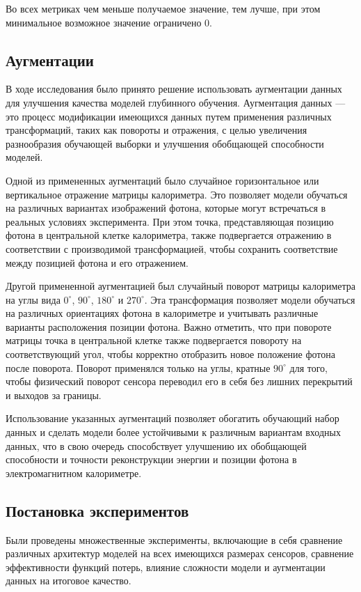 \documentclass[a4paper,12pt]{extarticle}
\begin{document}
Во всех метриках чем меньше получаемое значение, тем лучше, при этом минимальное возможное значение ограничено $0$.

\subsection{Аугментации}
\label{subsection:augmentations}

В ходе исследования было принято решение использовать аугментации данных для улучшения качества моделей глубинного обучения. Аугментация данных --- это процесс модификации имеющихся данных путем применения различных трансформаций, таких как повороты и отражения, с целью увеличения разнообразия обучающей выборки и улучшения обобщающей способности моделей.

Одной из примененных аугментаций было случайное горизонтальное или вертикальное отражение матрицы калориметра. Это позволяет модели обучаться на различных вариантах изображений фотона, которые могут встречаться в реальных условиях эксперимента. При этом точка, представляющая позицию фотона в центральной клетке калориметра, также подвергается отражению в соответствии с производимой трансформацией, чтобы сохранить соответствие между позицией фотона и его отражением.

Другой примененной аугментацией был случайный поворот матрицы калориметра на углы вида $0^{\circ}$, $90^{\circ}$, $180^{\circ}$ и $270^{\circ}$. Эта трансформация позволяет модели обучаться на различных ориентациях фотона в калориметре и учитывать различные варианты расположения позиции фотона. Важно отметить, что при повороте матрицы точка в центральной клетке также подвергается повороту на соответствующий угол, чтобы корректно отобразить новое положение фотона после поворота. Поворот применялся только на углы, кратные $90^{\circ}$ для того, чтобы физический поворот сенсора переводил его в себя без лишних перекрытий и выходов за границы.

Использование указанных аугментаций позволяет обогатить обучающий набор данных и сделать модели более устойчивыми к различным вариантам входных данных, что в свою очередь способствует улучшению их обобщающей способности и точности реконструкции энергии и позиции фотона в электромагнитном калориметре.

\subsection{Постановка экспериментов}

Были проведены множественные эксперименты, включающие в себя сравнение различных архитектур моделей на всех имеющихся размерах сенсоров, сравнение эффективности функций потерь, влияние сложности модели и аугментации данных на итоговое качество.
\end{document}
